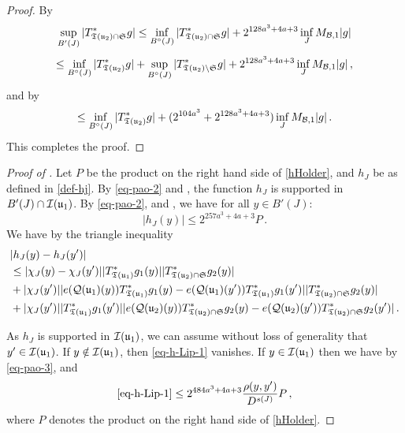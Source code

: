     \begin{proof}
        \leanok
        By 
        $$
            \sup_{B'(J)} |T^*_{{\mathfrak T}({\mathfrak u}_2) \cap \mathfrak{S}} g| \le \inf_{B^\circ{}(J)} |T_{{\mathfrak T}({\mathfrak u}_2) \cap \mathfrak{S}}^* g| + 2^{128a^3+4a+3} \inf_{J} M_{\mathcal{B}, 1} |g|
        $$
        $$
            \le \inf_{B^\circ{}(J)} |T_{{\mathfrak T}({\mathfrak u}_2)}^* g| + \sup_{B^\circ{}(J)} |T_{{\mathfrak T}({\mathfrak u}_2) \setminus \mathfrak{S}}^* g| + 2^{128a^3+4a+3} \inf_{J} M_{\mathcal{B}, 1} |g|\,,
        $$
        and by 
        $$
            \le \inf_{B^\circ{}(J)} |T_{{\mathfrak T}({\mathfrak u}_2)}^* g| + (2^{104a^3} + 2^{128a^3+4a+3}) \inf_{J} M_{\mathcal{B}, 1} |g|\,.
        $$
        This completes the proof.
    \end{proof}

    \begin{proof}[Proof of ]
        \leanok
        Let $P$ be the product on the right hand side of \eqref{hHolder}, and $h_J$ be as defined in \eqref{def-hj}.
        By \eqref{eq-pao-2} and , the function $h_J$ is supported in $B'(J) \cap {\mathcal{I}}({\mathfrak u}_1)$.
        By \eqref{eq-pao-2},  and , we have for all $y \in B'(J)$:
        $$
            |h_J(y)| \le 2^{257a^3+4a+3} P\,.
        $$
        We have by the triangle inequality
        \begin{align}
            &|h_J(y) - h_J(y')|\nonumber\\
            \label{eq-h-Lip-1}
            &\le |\chi_J(y) - \chi_J(y')| |T_{{\mathfrak T}({\mathfrak u}_1)}^* g_1(y)| |T_{{\mathfrak T}({\mathfrak u}_2) \cap \mathfrak{S}}^* g_2(y)|\\
            \label{eq-h-Lip-2}
            & + |\chi_J(y')| |e({\mathcal{Q}}({\mathfrak u}_1)(y)) T_{{\mathfrak T}({\mathfrak u}_1)}^* g_1(y) - e({\mathcal{Q}}({\mathfrak u}_1)(y')) T_{{\mathfrak T}({\mathfrak u}_1)}^* g_1(y')| |T_{{\mathfrak T}({\mathfrak u}_2) \cap \mathfrak{S}}^* g_2(y)|\\
            \label{eq-h-Lip-3}
            & + |\chi_J(y')| |T_{{\mathfrak T}({\mathfrak u}_1)}^* g_1(y')| |e({\mathcal{Q}}({\mathfrak u}_2)(y)) T_{{\mathfrak T}({\mathfrak u}_2) \cap \mathfrak{S}}^* g_2(y) - e({\mathcal{Q}}({\mathfrak u}_2)(y')) T_{{\mathfrak T}({\mathfrak u}_2) \cap \mathfrak{S}}^* g_2(y')|\,.
        \end{align}

        As $h_J$ is supported in ${\mathcal{I}}({\mathfrak u}_1)$, we can assume without loss of generality that $y' \in {\mathcal{I}}({\mathfrak u}_1)$.
        If $y \notin {\mathcal{I}}({\mathfrak u}_1)$, then \eqref{eq-h-Lip-1} vanishes. If $y \in {\mathcal{I}}({\mathfrak u}_1)$ then we have by \eqref{eq-pao-3},  and 
        $$
            \eqref{eq-h-Lip-1} \le 2^{484a^3+4a+3} \frac{\rho(y,y')}{D^{s(J)}} P\,,
        $$
        where $P$ denotes the product on the right hand side of \eqref{hHolder}.


\end{proof}
